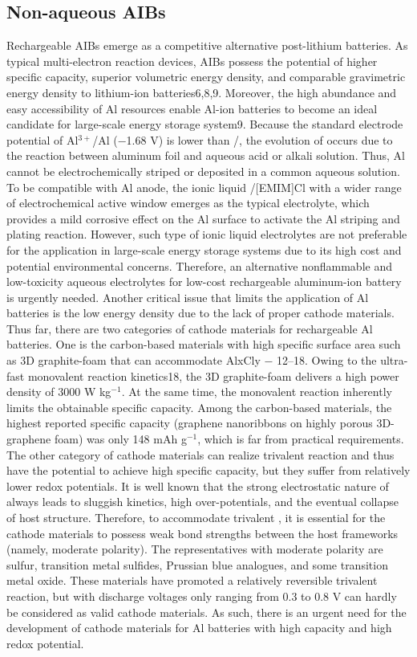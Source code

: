 {\subsection{Non-aqueous AIBs}
Rechargeable AIBs emerge as a competitive alternative post-lithium batteries. As typical multi-electron reaction devices, AIBs possess the potential of higher specific capacity, superior volumetric energy density, and comparable gravimetric energy density to lithium-ion batteries6,8,9. Moreover, the high abundance and easy accessibility of Al resources enable Al-ion batteries to become an ideal candidate for large-scale energy storage system9. Because the standard electrode potential of Al$^{3+}$/Al (−1.68 V) is lower than /, the evolution of  occurs due to the reaction between aluminum foil and aqueous acid or alkali solution. Thus, Al cannot be electrochemically striped or deposited in a common aqueous solution. To be compatible with Al anode, the ionic liquid /[EMIM]Cl with a wider range of electrochemical active window emerges as the typical electrolyte, which provides a mild corrosive effect on the Al surface to activate the Al striping and plating reaction. However, such type of ionic liquid electrolytes are not preferable for the application in large-scale energy storage systems due to its high cost and potential environmental concerns. Therefore, an alternative nonflammable and low-toxicity aqueous electrolytes for low-cost rechargeable aluminum-ion battery is urgently needed. Another critical issue that limits the application of Al batteries is the low energy density due to the lack of proper cathode materials. Thus far, there are two categories of cathode materials for rechargeable Al batteries. One is the carbon-based materials with high specific surface area such as 3D graphite-foam that can accommodate AlxCly − 12–18. Owing to the ultra-fast monovalent reaction kinetics18, the 3D graphite-foam delivers a high power density of 3000 W kg$^{−1}$. At the same time, the monovalent reaction inherently limits the obtainable specific capacity. Among the carbon-based materials, the highest reported specific capacity (graphene nanoribbons on highly porous 3D-graphene foam) was only 148 mAh g$^{−1}$, which is far from practical requirements. The other category of cathode materials can realize trivalent reaction and thus have the potential to achieve high specific capacity, but they suffer from relatively lower redox potentials. It is well known that the strong electrostatic nature of  always leads to sluggish kinetics, high over-potentials, and the eventual collapse of host structure. Therefore, to accommodate trivalent , it is essential for the cathode materials to possess weak bond strengths between the host frameworks (namely, moderate polarity). The representatives with moderate polarity are sulfur, transition metal sulfides, Prussian blue analogues, and some transition metal oxide. These materials have promoted a relatively reversible trivalent reaction, but with discharge voltages only ranging from 0.3 to 0.8 V can hardly be considered as valid cathode materials. As such, there is an urgent need for the development of cathode materials for Al batteries with high capacity and high redox potential.

}
